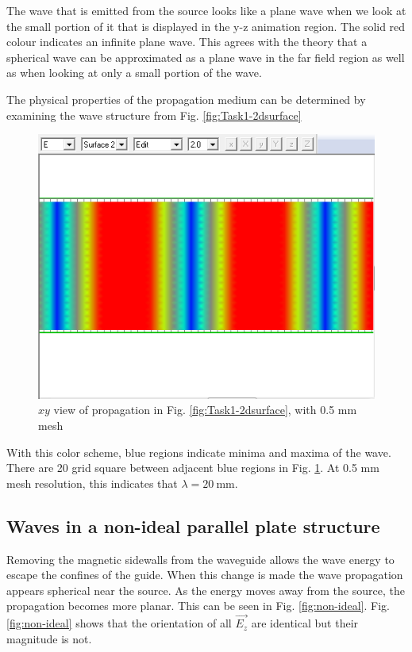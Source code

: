 The wave that is emitted from the source looks like a plane wave when we look at the small portion of it that is displayed in the y-z animation region. The solid red colour indicates an infinite plane wave. This agrees with the theory that a spherical wave can be approximated as a plane wave in the far field region as well as when looking at only a small portion of the wave. 

The physical properties of the propagation medium can be determined by examining the wave structure from Fig. \ref{fig:Task1-2dsurface}

\begin{figure}[tbph]
	\centering
	\includegraphics[width=0.7\linewidth]{graphics/Task1-scale}
	\caption{$xy$ view of propagation in Fig. \ref{fig:Task1-2dsurface}, with 0.5 mm mesh}
	\label{fig:Task1-scale}
\end{figure}

With this color scheme, blue regions indicate minima and maxima of the wave.
There are 20 grid square between adjacent blue regions in Fig. \ref{fig:Task1-scale}.
At 0.5 mm mesh resolution, this indicates that $\lambda = \SI{20}{\milli\meter}$.

\subsection{Waves in a non-ideal parallel plate structure}\label{sec:non-ideal}
Removing the magnetic sidewalls from the waveguide allows the wave energy to escape the confines of the guide.
When this change is made the wave propagation appears spherical near the source.
As the energy moves away from the source, the propagation becomes more planar.
This can be seen in Fig. \ref{fig:non-ideal}.
Fig. \ref{fig:non-ideal} shows that the orientation of all $\vec{E_z}$ are identical but their magnitude is not.


